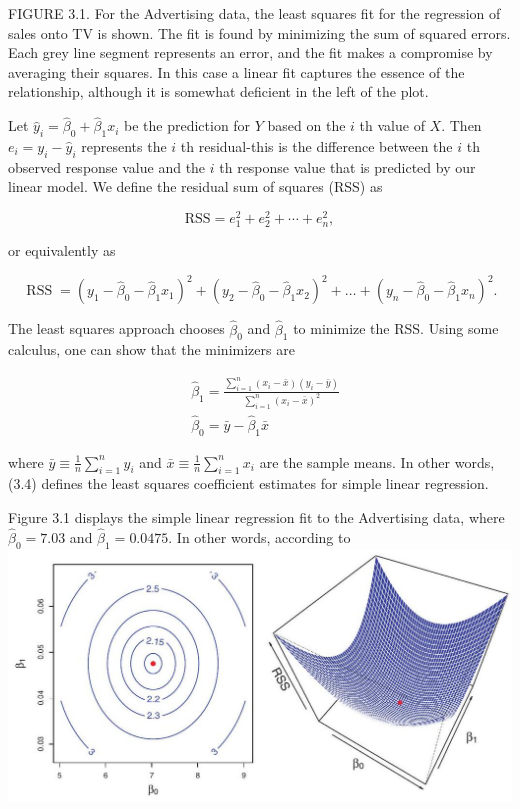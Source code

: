 \documentclass[10pt]{article}
\begin{document}
FIGURE 3.1. For the Advertising data, the least squares fit for the regression of sales onto TV is shown. The fit is found by minimizing the sum of squared errors. Each grey line segment represents an error, and the fit makes a compromise by averaging their squares. In this case a linear fit captures the essence of the relationship, although it is somewhat deficient in the left of the plot.

Let $\hat{y}_{i}=\hat{\beta}_{0}+\hat{\beta}_{1} x_{i}$ be the prediction for $Y$ based on the $i$ th value of $X$. Then $e_{i}=y_{i}-\hat{y}_{i}$ represents the $i$ th residual-this is the difference between the $i$ th observed response value and the $i$ th response value that is predicted by our linear model. We define the residual sum of squares (RSS) as

$$
\mathrm{RSS}=e_{1}^{2}+e_{2}^{2}+\cdots+e_{n}^{2},
$$

or equivalently as


\begin{equation*}
\operatorname{RSS}=\left(y_{1}-\hat{\beta}_{0}-\hat{\beta}_{1} x_{1}\right)^{2}+\left(y_{2}-\hat{\beta}_{0}-\hat{\beta}_{1} x_{2}\right)^{2}+\ldots+\left(y_{n}-\hat{\beta}_{0}-\hat{\beta}_{1} x_{n}\right)^{2} . \tag{3.3}
\end{equation*}


The least squares approach chooses $\hat{\beta}_{0}$ and $\hat{\beta}_{1}$ to minimize the RSS. Using some calculus, one can show that the minimizers are


\begin{align*}
& \hat{\beta}_{1}=\frac{\sum_{i=1}^{n}\left(x_{i}-\bar{x}\right)\left(y_{i}-\bar{y}\right)}{\sum_{i=1}^{n}\left(x_{i}-\bar{x}\right)^{2}}  \tag{3.4}\\
& \hat{\beta}_{0}=\bar{y}-\hat{\beta}_{1} \bar{x}
\end{align*}


where $\bar{y} \equiv \frac{1}{n} \sum_{i=1}^{n} y_{i}$ and $\bar{x} \equiv \frac{1}{n} \sum_{i=1}^{n} x_{i}$ are the sample means. In other words, (3.4) defines the least squares coefficient estimates for simple linear regression.

Figure 3.1 displays the simple linear regression fit to the Advertising data, where $\hat{\beta}_{0}=7.03$ and $\hat{\beta}_{1}=0.0475$. In other words, according to\\
\includegraphics[max width=\textwidth, center]{2025_05_05_efe77898333945044de4g-078}
\end{document}

